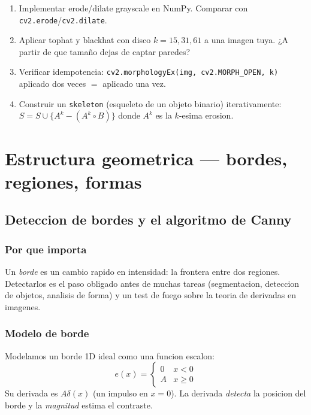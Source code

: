 \documentclass[11pt,a4paper,twoside,openright]{book}
\begin{document}
\begin{ejercicio}
\begin{enumerate}[leftmargin=2em]
  \item Implementar erode/dilate grayscale en NumPy. Comparar con \texttt{cv2.erode}/\texttt{cv2.dilate}.
  \item Aplicar tophat y blackhat con disco $k=15, 31, 61$ a una imagen tuya. ¿A partir de que tamaño dejas de captar paredes?
  \item Verificar idempotencia: \texttt{cv2.morphologyEx(img, cv2.MORPH\_OPEN, k)} aplicado dos veces $=$ aplicado una vez.
  \item Construir un \texttt{skeleton} (esqueleto de un objeto binario) iterativamente: $S = S \cup \{A^k - (A^k \circ B)\}$ donde $A^k$ es la $k$-esima erosion.
\end{enumerate}
\end{ejercicio}

\part{Estructura geometrica --- bordes, regiones, formas}

\chapter{Deteccion de bordes y el algoritmo de Canny}
\label{ch:canny}

\section{Por que importa}

Un \emph{borde} es un cambio rapido en intensidad: la frontera entre dos regiones. Detectarlos es el paso obligado antes de muchas tareas (segmentacion, deteccion de objetos, analisis de forma) y un test de fuego sobre la teoria de derivadas en imagenes.

\section{Modelo de borde}

Modelamos un borde 1D ideal como una funcion escalon:
\begin{equation}
e(x) = \begin{cases} 0 & x < 0 \\ A & x \geq 0 \end{cases}
\end{equation}
Su derivada es $A \delta(x)$ (un impulso en $x=0$). La derivada \emph{detecta} la posicion del borde y la \emph{magnitud} estima el contraste.
\end{document}

